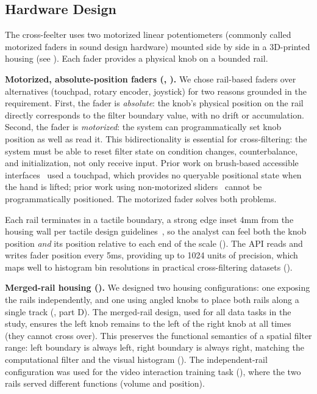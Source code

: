 \documentclass[12pt]{cmuthesis}
\begin{document}
\subsection{Hardware Design} \label{sec:hardware} 

The cross-feelter uses two motorized linear potentiometers (commonly called motorized faders in sound design hardware) mounted side by side in a 3D-printed housing (see ). Each fader provides a physical knob on a bounded rail.

\textbf{Motorized, absolute-position faders (, ).} We chose rail-based faders over alternatives (touchpad, rotary encoder, joystick) for two reasons grounded in the  requirement. First, the fader is \textit{absolute}: the knob's physical position on the rail directly corresponds to the filter boundary value, with no drift or accumulation. Second, the fader is \textit{motorized}: the system can programmatically set knob position as well as read it. This bidirectionality is essential for cross-filtering: the system must be able to reset filter state on condition changes, counterbalance, and initialization, not only receive input. Prior work on brush-based accessible interfaces~\cite{Sharif2024} used a touchpad, which provides no queryable positional state when the hand is lifted; prior work using non-motorized sliders~\cite{Zhang2018} cannot be programmatically positioned. The motorized fader solves both problems.

Each rail terminates in a tactile boundary, a strong edge inset 4mm from the housing wall per tactile design guidelines~\cite{Gorlewicz2020}, so the analyst can feel both the knob position \textit{and} its position relative to each end of the scale (). The API reads and writes fader position every 5ms, providing up to 1024 units of precision, which maps well to histogram bin resolutions in practical cross-filtering datasets ().

\textbf{Merged-rail housing ().} We designed two housing configurations: one exposing the rails independently, and one using angled knobs to place both rails along a single track (, part D). The merged-rail design, used for all data tasks in the study, ensures the left knob remains to the left of the right knob at all times (they cannot cross over). This preserves the functional semantics of a spatial filter range: left boundary is always left, right boundary is always right, matching the computational filter and the visual histogram (). The independent-rail configuration was used for the video interaction training task (), where the two rails served different functions (volume and position).
\end{document}
